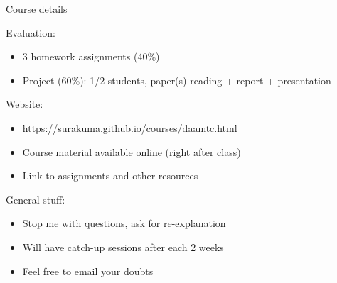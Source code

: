 \documentclass[
	12pt, %
]{beamer}
\newcommand{\brown}[1]{{\color{brown} #1 }}
\begin{document}
\begin{frame}{Course details}

\brown{Evaluation:}
\begin{itemize}
	\item 3 homework assignments (40\%)
	\item Project (60\%): 1/2 students, paper(s) reading + report + presentation
\end{itemize}
\vfill
\brown{Website:}
\begin{itemize}
	\item \url{https://surakuma.github.io/courses/daamtc.html}
	\item Course material available online (right after class)
	\item Link to assignments and other resources
\end{itemize}
\vfill
\brown{General stuff:}
\begin{itemize}
	\item Stop me with questions, ask for re-explanation
	\item Will have catch-up sessions after each 2 weeks
	\item Feel free to email your doubts
\end{itemize}


\end{frame}
\end{document}
